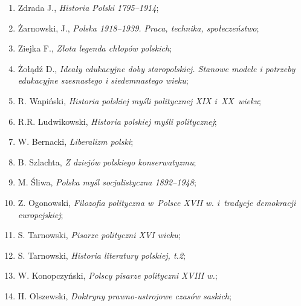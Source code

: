 \documentclass[a4paper,11pt]{article}
\begin{document}
\begin{enumerate}
\item Zdrada J., \textit{Historia Polski 1795--1914};



\item Żarnowski, J., \textit{Polska 1918--1939. Praca, technika,
    społeczeństwo};



\item Ziejka F., \textit{Złota legenda chłopów polskich};



\item Żołądź D., \textit{Ideały edukacyjne doby staropolskiej. Stanowe
    modele i potrzeby edukacyjne szesnastego i siedemnastego wieku};



\item R. Wapiński, \textit{Historia polskiej myśli politycznej XIX
    i~XX~wieku};



\item R.R. Ludwikowski, \textit{Historia polskiej myśli politycznej};



\item W. Bernacki, \textit{Liberalizm polski};



\item B. Szlachta, \textit{Z dziejów polskiego konserwatyzmu};



\item M. Śliwa, \textit{Polska myśl socjalistyczna 1892--1948};



\item Z. Ogonowski, \textit{Filozofia polityczna w~Polsce XVII w.
    i~tradycje demokracji europejskiej};



\item S. Tarnowski, \textit{Pisarze polityczni XVI wieku};



\item S. Tarnowski, \textit{Historia literatury polskiej, t.2};



\item W. Konopczyński, \textit{Polscy pisarze polityczni XVIII w.};



\item H. Olszewski, \textit{Doktryny prawno-ustrojowe czasów saskich};




\end{enumerate}
\end{document}
